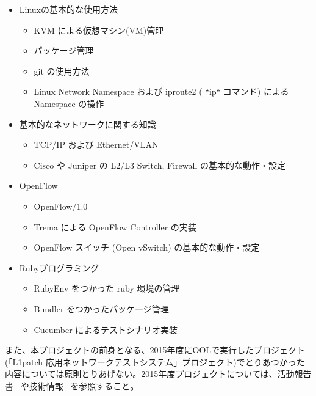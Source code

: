 \begin{itemize}
 \item Linuxの基本的な使用方法
       \begin{itemize}
        \item KVM による仮想マシン(VM)管理
        \item パッケージ管理
        \item git の使用方法
        \item Linux Network Namespace および iproute2 ( ``ip`` コマンド)
              によるNamespace の操作
       \end{itemize}
 \item 基本的なネットワークに関する知識
       \begin{itemize}
        \item TCP/IP および Ethernet/VLAN
        \item Cisco や Juniper の L2/L3 Switch, Firewall の基本的な動作・設定
       \end{itemize}
 \item OpenFlow
       \begin{itemize}
        \item OpenFlow/1.0
        \item Trema による OpenFlow Controller の実装
        \item OpenFlow スイッチ (Open vSwitch) の基本的な動作・設定
       \end{itemize}
 \item Rubyプログラミング
       \begin{itemize}
        \item RubyEnv をつかった ruby 環境の管理
        \item Bundler をつかったパッケージ管理
        \item Cucumber によるテストシナリオ実装
       \end{itemize}
\end{itemize}

また、本プロジェクトの前身となる、2015年度にOOLで実行したプロジェクト
(「L1patch 応用ネットワークテストシステム」プロジェクト)でとりあつかった
内容については原則とりあげない。2015年度プロジェクトについては、活動報告
書~\cite{l1pjpoc} や技術情報~\cite{l1pjtech} を参照すること。

